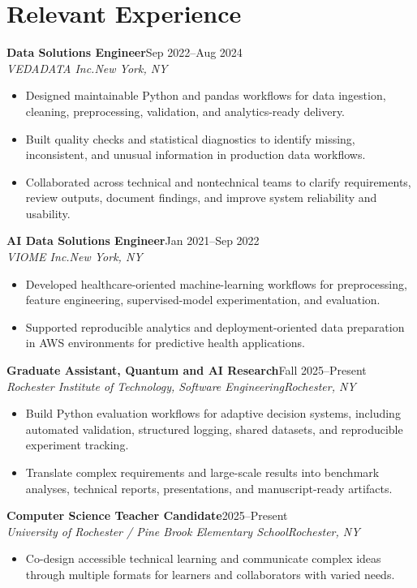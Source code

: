 \documentclass[10pt,letterpaper]{article}
\newcommand{\role}[4]{%
  \textbf{#1}\hfill #2\\
  \textit{#3}\hfill \textit{#4}\vspace{-3pt}
}
\begin{document}
\section*{Relevant Experience}
\role{Data Solutions Engineer}{Sep 2022--Aug 2024}
{VEDADATA Inc.}{New York, NY}
\begin{itemize}
  \item Designed maintainable Python and pandas workflows for data ingestion,
    cleaning, preprocessing, validation, and analytics-ready delivery.
  \item Built quality checks and statistical diagnostics to identify missing,
    inconsistent, and unusual information in production data workflows.
  \item Collaborated across technical and nontechnical teams to clarify
    requirements, review outputs, document findings, and improve system
    reliability and usability.
\end{itemize}

\role{AI Data Solutions Engineer}{Jan 2021--Sep 2022}
{VIOME Inc.}{New York, NY}
\begin{itemize}
  \item Developed healthcare-oriented machine-learning workflows for
    preprocessing, feature engineering, supervised-model experimentation, and
    evaluation.
  \item Supported reproducible analytics and deployment-oriented data
    preparation in AWS environments for predictive health applications.
\end{itemize}

\role{Graduate Assistant, Quantum and AI Research}{Fall 2025--Present}
{Rochester Institute of Technology, Software Engineering}{Rochester, NY}
\begin{itemize}
  \item Build Python evaluation workflows for adaptive decision systems,
    including automated validation, structured logging, shared datasets, and
    reproducible experiment tracking.
  \item Translate complex requirements and large-scale results into benchmark
    analyses, technical reports, presentations, and manuscript-ready artifacts.
\end{itemize}

\role{Computer Science Teacher Candidate}{2025--Present}
{University of Rochester / Pine Brook Elementary School}{Rochester, NY}
\begin{itemize}
  \item Co-design accessible technical learning and communicate complex ideas
    through multiple formats for learners and collaborators with varied needs.
\end{itemize}
\end{document}
